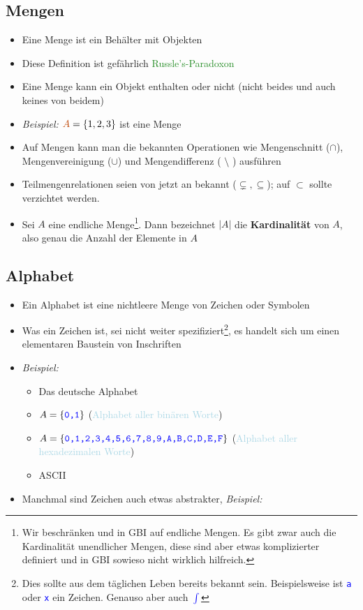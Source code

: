 \documentclass{article}
\newcommand{\blue}[1]{\textcolor{blue}{#1}}
\newcommand{\babyblue}[1]{\textcolor{lightblue}{#1}}
\newcommand{\strongColor}[1]{\textcolor{strongColor}{#1}}
\newcommand{\strong}[1]{\textbf{\strongColor{#1}}}
\newcommand{\verweis}[1]{\textcolor{ForestGreen}{#1}}
\newcommand{\example}[1]{\textit{Beispiel: }#1}
\newcommand{\word}[1]{\blue{\texttt{#1}}}
\newcommand{\interpretation}[1]{\babyblue{#1}}
\newcommand{\Fbox}[1]{\fbox{\strut#1}}
\newcommand*{\wordbox}[1]{\Fbox{#1}}
\begin{document}
\subsection{Mengen}
\begin{itemize}
    \item Eine Menge ist ein \dq Behälter\dq{} mit \dq Objekten\dq{}
    \item Diese Definition ist gefährlich \verweis{Russle's-Paradoxon}
    \item Eine Menge kann ein Objekt enthalten oder nicht (nicht beides und auch keines von beidem)
    \item \example{$\strongColor{A} = \{1,2,3\}$} ist eine Menge
    \item Auf Mengen kann man die bekannten Operationen wie Mengenschnitt ($\cap$), Mengenvereinigung ($\cup$) und Mengendifferenz ( $\setminus$ ) ausführen
    \item Teilmengenrelationen seien von jetzt an bekannt ($\subsetneq, \subseteq$); auf $\subset$ sollte verzichtet werden.
    \item Sei $A$ eine endliche Menge\footnote{Wir beschränken und in GBI auf endliche Mengen. Es gibt zwar auch die Kardinalität unendlicher Mengen, diese sind aber etwas komplizierter definiert und in GBI sowieso nicht wirklich hilfreich.}. Dann bezeichnet $|A|$ die \strong{Kardinalität} von $A$, also genau die Anzahl der Elemente in $A$
\end{itemize}

\subsection{Alphabet}
\begin{itemize}
    \item Ein Alphabet ist eine nichtleere Menge von Zeichen oder Symbolen
    \item Was ein Zeichen ist, sei nicht weiter spezifiziert\footnote{Dies sollte aus dem täglichen Leben bereits bekannt sein. Beispielsweise ist \word{a} oder \word{x} ein Zeichen. Genauso aber auch \word{$\int$}}, es handelt sich um einen elementaren Baustein von Inschriften
    \item \example{}
    \begin{itemize}
        \item Das deutsche Alphabet
        \item $A=\{\word{0,1}\}$ (\interpretation{Alphabet aller binären Worte})
        \item $A=\{\word{0,1,2,3,4,5,6,7,8,9,A,B,C,D,E,F}\}$ (\interpretation{Alphabet aller hexadezimalen Worte})
        \item ASCII
    \end{itemize}
    \item Manchmal sind Zeichen auch etwas abstrakter, \example{\word{\wordbox{int} \wordbox{counter} \wordbox{=} \wordbox{42} \wordbox{;}}}
\end{itemize}
\end{document}
